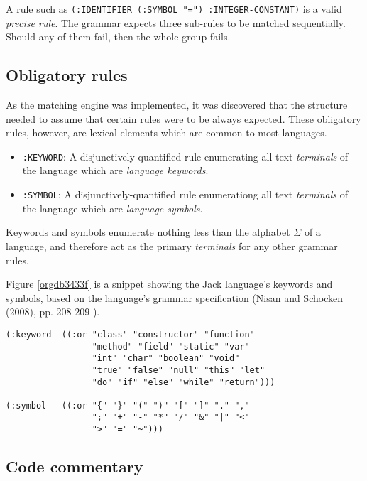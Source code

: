 \documentclass[a4paper,11pt,oneside]{article}
\begin{document}
A rule such as \texttt{(:IDENTIFIER (:SYMBOL "=") :INTEGER-CONSTANT)} is a
valid \emph{precise rule}. The grammar expects three sub-rules to be matched
sequentially. Should any of them fail, then the whole group fails.

\subsection*{Obligatory rules}
\label{sec:org1143381}

As the matching engine was implemented, it was discovered that the
structure needed to assume that certain rules were to be
always expected. These obligatory rules, however, are lexical elements
which are common to most languages.

\begin{itemize}
\item \texttt{:KEYWORD}: A disjunctively-quantified rule enumerating all text
\emph{terminals} of the language which are \emph{language keywords}.
\item \texttt{:SYMBOL}: A disjunctively-quantified rule enumerationg all text
\emph{terminals} of the language which are \emph{language symbols}.
\end{itemize}

Keywords and symbols enumerate nothing less than the alphabet \(\Sigma\)
of a language, and therefore act as the primary \emph{terminals} for any
other grammar rules.

Figure \ref{orgdb3433f} is a snippet showing the Jack language's
keywords and symbols, based on the language's grammar specification
(Nisan and Schocken (2008), pp. 208-209 \cite{nand2tetris}).

\begin{verbatim}
(:keyword  ((:or "class" "constructor" "function"
                 "method" "field" "static" "var"
                 "int" "char" "boolean" "void"
                 "true" "false" "null" "this" "let"
                 "do" "if" "else" "while" "return")))

(:symbol   ((:or "{" "}" "(" ")" "[" "]" "." ","
                 ";" "+" "-" "*" "/" "&" "|" "<"
                 ">" "=" "~")))
\end{verbatim}

\subsection*{Code commentary}
\label{sec:orga7adedd}
\end{document}
